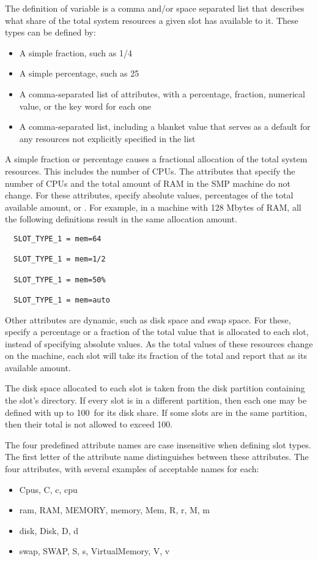 The definition of variable 
is a comma and/or space separated list that
describes what share of the total system resources a given
slot has available to it.
These types can be defined by:
\begin{itemize}
  \item A simple fraction, such as 1/4
  \item A simple percentage, such as 25\Percent
  \item A comma-separated list of attributes, with a percentage,
	fraction, numerical value, or the key word  for each one
  \item A comma-separated list, including a blanket value that serves
        as a default for any resources not explicitly specified in the list
\end{itemize}
A simple fraction or percentage causes a fractional allocation
of the total system resources.
This includes the number of CPUs.
The attributes that specify the number of CPUs
and the total amount of RAM in
the SMP machine do not change.
For these attributes, specify absolute values,
percentages of the total available amount, or .  
For example, in a machine with 128 Mbytes of RAM,
all the following definitions result in the same allocation amount.
\begin{verbatim}
  SLOT_TYPE_1 = mem=64

  SLOT_TYPE_1 = mem=1/2

  SLOT_TYPE_1 = mem=50%

  SLOT_TYPE_1 = mem=auto
\end{verbatim}

Other attributes are dynamic, such as disk space and swap space.
For these, specify a percentage or a fraction of the total
value that is allocated to each slot, instead of specifying absolute values.
As the total values of these resources change on the machine,
each slot will take its fraction of the total and report that as its
available amount.

The disk space allocated to each slot is taken from the disk partition
containing the slot's  directory. 
If every slot is in a different partition, 
then each one may be defined with up to
100\Percent\ for its disk share.
If some slots are in the same partition, 
then their total is not allowed to exceed 100\Percent.

The four predefined attribute names are case insensitive when defining 
slot types.
The first letter of the attribute name distinguishes between
these attributes.
The four attributes, with several examples of acceptable names for each:
\begin{itemize}
  \item Cpus, C, c, cpu 
  \item ram, RAM, MEMORY, memory, Mem, R, r, M, m
  \item disk, Disk, D, d
  \item swap, SWAP, S, s, VirtualMemory, V, v
\end{itemize}

